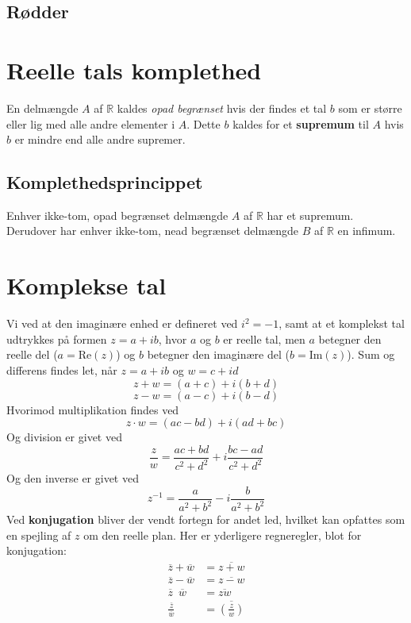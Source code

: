 \subsection{Rødder}

\section{Reelle tals komplethed}
En delmængde $A$ af $\mathbb{R}$ kaldes \textit{opad begrænset} hvis der findes et tal $b$ som er større eller lig med alle andre elementer i $A$. Dette $b$ kaldes for et \textbf{supremum} til $A$ hvis $b$ er mindre end alle andre supremer.\subsection{Komplethedsprincippet}Enhver ikke-tom, opad begrænset delmængde $A$ af $\mathbb{R}$ har et supremum.\\Derudover har enhver ikke-tom, nead begrænset delmængde $B$ af $\mathbb{R}$ en infimum.
\section{Komplekse tal}
Vi ved at den imaginære enhed er defineret ved $i^2=-1$, samt at et komplekst tal udtrykkes på formen $z=a+ib$, hvor $a$ og $b$ er reelle tal, men $a$ betegner den reelle del ($a=\text{Re}(z)$) og $b$ betegner den imaginære del ($b=\text{Im}(z)$). Sum og differens findes let, når $z=a+ib$ og $w=c+id$
\begin{equation}
    z+w=(a+c)+i(b+d)
\end{equation}
\begin{equation}
    z-w=(a-c)+i(b-d)
\end{equation}
Hvorimod multiplikation findes ved 
\begin{equation}
    z\cdot w=(ac-bd)+i(ad+bc)
\end{equation}
Og division er givet ved 
\begin{equation}
    \frac{z}{w}=\frac{ac+bd}{c^2+d^2}+i\frac{bc-ad}{c^2+d^2}
\end{equation}
Og den inverse er givet ved 
\begin{equation}
    z^{-1}=\frac{a}{a^2+b^2}-i\frac{b}{a^2+b^2}
\end{equation}
Ved \textbf{konjugation} bliver der vendt fortegn for andet led, hvilket kan opfattes som en spejling af $z$ om den reelle plan. Her er yderligere regneregler, blot for konjugation:
\begin{align}
    \overline{z}+\overline{w}&=\overline{z+w}\\
    \overline{z}-\overline{w}&=\overline{z-w}\\
    \overline{z}\,\,\,\overline{w}&=\overline{zw}\\
    \frac{\overline{z}}{\overline{w}}&=\overline{\left(\frac{z}{w}\right)}
\end{align}
